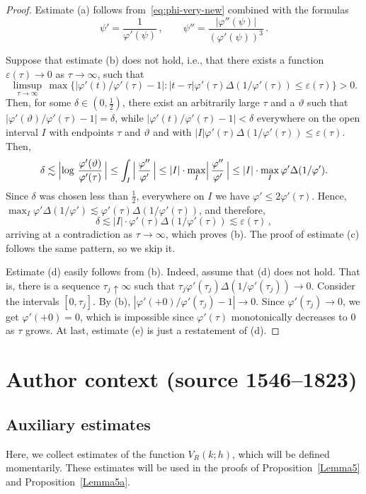 \documentclass[10pt,a4paper]{amsart}
\def\ep{{\varepsilon}}
\begin{document}
\begin{proof}
Estimate (a) follows from~\eqref{eq:phi-very-new} combined with the formulas
\[
\psi' = \frac1{\varphi'(\psi)}\,,
\qquad \psi''=\frac{|\varphi''(\psi)|}{(\varphi'(\psi))^3}\,.
\]

Suppose that estimate (b) does not hold, i.e., that there exists a function $\ep(\tau)\to 0$
as $\tau\to\infty$, such that
\[
\limsup_{\tau\to\infty}\, \max\{|\varphi'(t)/\varphi'(\tau)-1|\colon |t-\tau|\varphi'(\tau)\Delta(1/\varphi'(\tau)) \le \ep(\tau) \} > 0.
\]
Then, for some $\delta\in (0, \tfrac12)$, there exist an arbitrarily large $\tau$ and a
$\vartheta$ such that $|\varphi' (\vartheta)/\varphi'(\tau)-1|=\delta$, while
$|\varphi' (t)/\varphi'(\tau)-1|<\delta$ everywhere on the open interval $I$ with endpoints $\tau$ and $\vartheta$ and with $ |I|\varphi'(\tau)\Delta(1/\varphi'(\tau)) \le \ep(\tau) $.
Then,
\[
\delta \lesssim \Bigl| \log\,\frac{\varphi'(\vartheta)}{\varphi'(\tau)}\, \Bigr|
\le \int_I\, \Bigl|\, \frac{\varphi''}{\varphi'}\, \Bigr| \le |I|\cdot \max_I \Bigl|\, \frac{\varphi''}{\varphi'}\, \Bigr| \le |I|\cdot \max_I \varphi' \Delta(1/\varphi').
\]
Since $\delta$ was chosen less than $\tfrac12$,
everywhere on $I$ we have $ \varphi' \le 2\varphi'(\tau) $. Hence,
$ \max_I \varphi' \Delta(1/\varphi') \lesssim \varphi'(\tau) \Delta(1/\varphi'(\tau)) $, and therefore,
\[
\delta \lesssim |I| \cdot \varphi'(\tau) \Delta(1/\varphi'(\tau)) \lesssim \ep(\tau)\,,
\]
arriving at a contradiction as $\tau\to\infty$, which proves (b).
The proof of estimate (c) follows the same pattern, so we skip it.

Estimate (d) easily follows from (b). Indeed, assume that (d) does not hold.
That is, there is a sequence $\tau_j\uparrow\infty$ such that
$\tau_j \varphi'(\tau_j)\Delta(1/\varphi'(\tau_j))\to 0$. Consider the intervals
$[0, \tau_j]$. By (b), $|\varphi'(+0)/\varphi'(\tau_j)-1|\to 0$. Since $\varphi'(\tau_j)\to 0$,
we get $\varphi'(+0) = 0$, which is impossible since $\varphi'(\tau)$ monotonically decreases to $0$
as $\tau$ grows. At last, estimate (e) is just a restatement of (d).
\end{proof}

\section*{Author context (source 1546--1823)}
\subsection{Auxiliary estimates}
Here, we collect estimates of the function \newline\noindent $V_R(k; h)$, which will be defined
momentarily. These estimates will be used in the proofs of Proposition~\ref{Lemma5}
and Proposition~\ref{Lemma5a}.
\end{document}
